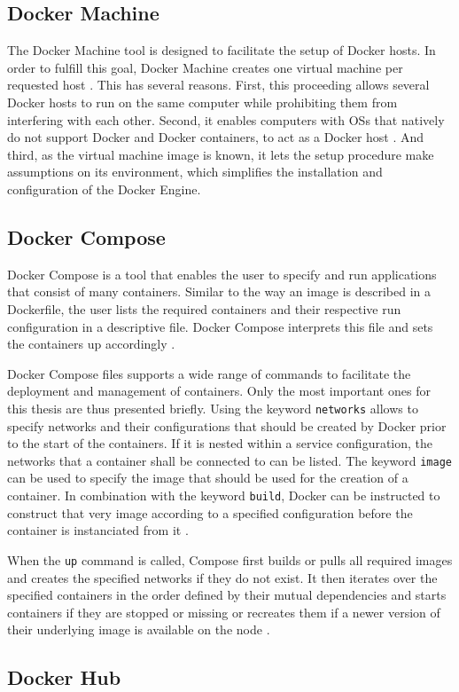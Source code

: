   \subsection{Docker Machine} %
  \label{sub:docker_machine}
    The Docker Machine tool is designed to facilitate the setup of Docker hosts. In order to fulfill this goal, Docker Machine creates one virtual machine per requested host \cite{Docker2016Dockera,Docker2016Docker}. This has several reasons. First, this proceeding allows several Docker hosts to run on the same computer while prohibiting them from interfering with each other. Second, it enables computers with \acp{OS} that natively do not support Docker and Docker containers, to act as a Docker host \cite{Docker2016Docker}. And third, as the virtual machine image is known, it lets the setup procedure make assumptions on its environment, which simplifies the installation and configuration of the Docker Engine.

  \subsection{Docker Compose} %
  \label{sub:docker_compose}
    Docker Compose is a tool that enables the user to specify and run applications that consist of many containers. Similar to the way an image is described in a Dockerfile, the user lists the required containers and their respective run configuration in a descriptive file. Docker Compose interprets this file and sets the containers up accordingly \cite{Docker2016Dockera}.

    Docker Compose files supports a wide range of commands to facilitate the deployment and management of containers. Only the most important ones for this thesis are thus presented briefly.
    Using the keyword \texttt{networks} allows to specify networks and their configurations that should be created by Docker prior to the start of the containers. If it is nested within a service configuration, the networks that a container shall be connected to can be listed.
    The keyword \texttt{image} can be used to specify the image that should be used for the creation of a container. In combination with the keyword \texttt{build}, Docker can be instructed to construct that very image according to a specified configuration before the container is instanciated from it \cite{Docker2016Docker}.

    When the \texttt{up} command is called, Compose first builds or pulls all required images and creates the specified networks if they do not exist. It then iterates over the specified containers in the order defined by their mutual dependencies and starts containers if they are stopped or missing or recreates them if a newer version of their underlying image is available on the node \cite{Docker2016Docker}.


  \subsection{Docker Hub} %
  \label{sub:docker_hub}


